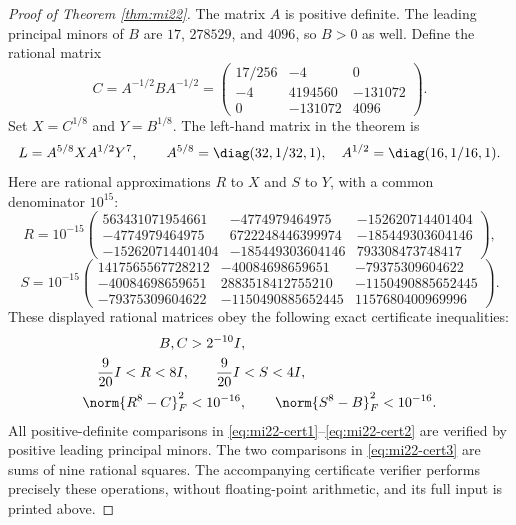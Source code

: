 \begin{proof}[Proof of Theorem \ref{thm:mi22}]
The matrix $A$ is positive definite. The leading principal minors of $B$ are $17$, $278529$, and $4096$, so $B>0$ as well. Define the rational matrix
\[
 C=A^{-1/2}BA^{-1/2}
 =\begin{pmatrix}
 17/256&-4&0\\-4&4194560&-131072\\0&-131072&4096
 \end{pmatrix}.
\]
Set $X=C^{1/8}$ and $Y=B^{1/8}$. The left-hand matrix in the theorem is
\[
 L=A^{5/8}XA^{1/2}Y^7,
 \qquad A^{5/8}=\diag(32,1/32,1),\quad A^{1/2}=\diag(16,1/16,1).
\]
Here are rational approximations $R$ to $X$ and $S$ to $Y$, with a common denominator $10^{15}$:
\begingroup\small
\[
 R=10^{-15}\begin{pmatrix}
 563431071954661&-4774979464975&-152620714401404\\
 -4774979464975&6722248446399974&-185449303604146\\
 -152620714401404&-185449303604146&793308473748417
 \end{pmatrix},
\]
\[
 S=10^{-15}\begin{pmatrix}
 1417565567728212&-40084698659651&-79375309604622\\
 -40084698659651&2883518412755210&-1150490885652445\\
 -79375309604622&-1150490885652445&1157680400969996
 \end{pmatrix}.
\]
\endgroup
These displayed rational matrices obey the following exact certificate inequalities:
\begin{align}
 B,C&>2^{-10}I,\label{eq:mi22-cert1}\\
 \frac9{20}I<R<8I,&\qquad \frac9{20}I<S<4I,\label{eq:mi22-cert2}\\
 \norm{R^8-C}_F^2&<10^{-16},\qquad \norm{S^8-B}_F^2<10^{-16}.\label{eq:mi22-cert3}
\end{align}
All positive-definite comparisons in \eqref{eq:mi22-cert1}--\eqref{eq:mi22-cert2} are verified by positive leading principal minors. The two comparisons in \eqref{eq:mi22-cert3} are sums of nine rational squares. The accompanying certificate verifier performs precisely these operations, without floating-point arithmetic, and its full input is printed above.


\end{proof}
